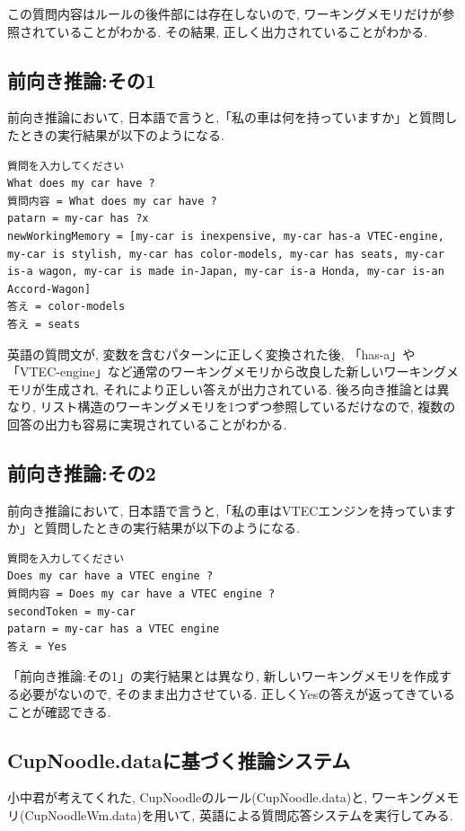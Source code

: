 \documentclass[uplatex,12pt]{jsarticle}
\begin{document}
この質問内容はルールの後件部には存在しないので, ワーキングメモリだけが参照されていることがわかる. その結果, 正しく出力されていることがわかる.

\subsection{前向き推論:その1}
前向き推論において, 日本語で言うと,「私の車は何を持っていますか」と質問したときの実行結果が以下のようになる.
\begin{lstlisting}
質問を入力してください
What does my car have ?
質問内容 = What does my car have ?
patarn = my-car has ?x
newWorkingMemory = [my-car is inexpensive, my-car has-a VTEC-engine, my-car is stylish, my-car has color-models, my-car has seats, my-car is-a wagon, my-car is made in-Japan, my-car is-a Honda, my-car is-an Accord-Wagon]
答え = color-models
答え = seats
\end{lstlisting}
英語の質問文が, 変数を含むパターンに正しく変換された後, 「has-a」や「VTEC-engine」など通常のワーキングメモリから改良した新しいワーキングメモリが生成され, それにより正しい答えが出力されている. 後ろ向き推論とは異なり, リスト構造のワーキングメモリを1つずつ参照しているだけなので, 複数の回答の出力も容易に実現されていることがわかる. 

\subsection{前向き推論:その2}
前向き推論において, 日本語で言うと,「私の車はVTECエンジンを持っていますか」と質問したときの実行結果が以下のようになる.
\begin{lstlisting}
質問を入力してください
Does my car have a VTEC engine ?
質問内容 = Does my car have a VTEC engine ?
secondToken = my-car
patarn = my-car has a VTEC engine
答え = Yes
\end{lstlisting}
「前向き推論:その1」の実行結果とは異なり, 新しいワーキングメモリを作成する必要がないので, そのまま出力させている. 正しくYesの答えが返ってきていることが確認できる.

\subsection{CupNoodle.dataに基づく推論システム}
小中君が考えてくれた, CupNoodleのルール(CupNoodle.data)と, ワーキングメモリ(CupNoodleWm.data)を用いて, 英語による質問応答システムを実行してみる. 
\end{document}
